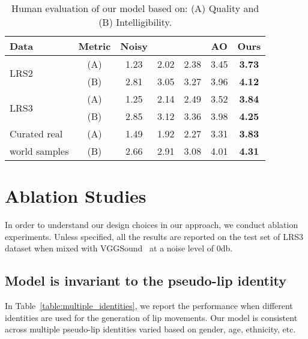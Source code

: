 \documentclass[10pt,twocolumn,letterpaper]{article}
\begin{document}
\begin{table}[ht]
    \centering
    \setlength{\tabcolsep}{3pt}
    \caption{Human evaluation of our model based on: (A) Quality and (B) Intelligibility.}
    \begin{tabular}{lcccccc}
    \hline
    Data & Metric & Noisy & ~\cite{segan} & ~\cite{Germain2019SpeechDW} & AO & Ours  \\
    \hline
    
    \multirow{2}{*}{LRS2} & (A) & 1.23 & 2.02 & 2.38 & 3.45 & \textbf{3.73}\\
    & (B) & 2.81 & 3.05 & 3.27 & 3.96 & \textbf{4.12}\\
    
    \hline
    
    \multirow{2}{*}{LRS3} & (A) & 1.25 & 2.14 & 2.49 & 3.52 & \textbf{3.84} \\
    & (B) & 2.85 & 3.12 & 3.36 & 3.98 & \textbf{4.25} \\
    
    \hline
    
    Curated real & (A) & 1.49 & 1.92 & 2.27 & 3.31 & \textbf{3.83} \\
    world samples & (B) & 2.66 & 2.91 & 3.08 & 4.01 & \textbf{4.31} \\
    
    \hline
    \end{tabular}
    \label{mos}
\end{table}


\section{Ablation Studies}
\label{section:ablation}

In order to understand our design choices in our approach, we conduct ablation experiments. Unless specified, all the results are reported on the test set of LRS3~\cite{Afouras18d} dataset when mixed with VGGSound~\cite{9053174} at a noise level of 0db. 

\subsection{Model is invariant to the pseudo-lip identity}

In Table~\ref{table:multiple_identities}, we report the performance when different identities are used for the generation of lip movements. Our model is consistent across multiple pseudo-lip identities varied based on gender, age, ethnicity, etc.  
\end{document}
